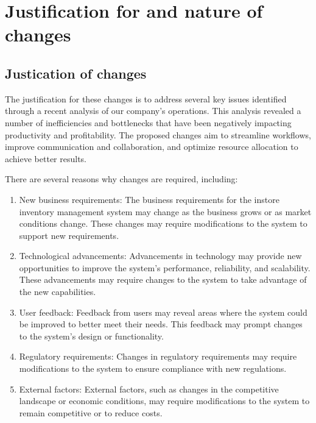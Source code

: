 \chapter{Justification for and nature of changes \\ 
\label{Chapter::Justificationforandnatureofchanges}} 
\section{Justication of changes \label{Section::Justicationofchanges}}
The justification for these changes is to address several key issues identified through a recent analysis of our company's operations. This analysis revealed a number of inefficiencies and bottlenecks that have been negatively impacting productivity and profitability. The proposed changes aim to streamline workflows, improve communication and collaboration, and optimize resource allocation to achieve better results.

\noindent
There are several reasons why changes are required, including:

\begin{enumerate}

    \item New business requirements: The business requirements for the instore inventory management system may change as the business grows or as market conditions change. These changes may require modifications to the system to support new requirements.

    \item Technological advancements: Advancements in technology may provide new opportunities to improve the system's performance, reliability, and scalability. These advancements may require changes to the system to take advantage of the new capabilities.

    \item User feedback: Feedback from users may reveal areas where the system could be improved to better meet their needs. This feedback may prompt changes to the system's design or functionality.

    \item Regulatory requirements: Changes in regulatory requirements may require modifications to the system to ensure compliance with new regulations.

    \item External factors: External factors, such as changes in the competitive landscape or economic conditions, may require modifications to the system to remain competitive or to reduce costs.

\end{enumerate}

